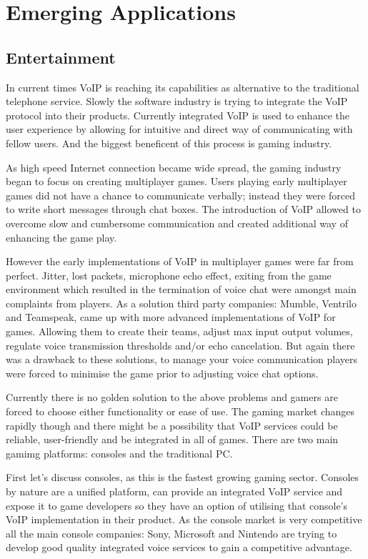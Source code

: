 
\section{Emerging  Applications}

\subsection{Entertainment}

In current times VoIP is reaching its capabilities as alternative to the traditional telephone service. Slowly the software industry is trying to integrate the VoIP protocol into their products. Currently integrated VoIP is used to enhance the user experience by allowing for intuitive and direct way of communicating with fellow users. And the biggest beneficent of this process is gaming industry. 

As high speed Internet connection became wide spread, the gaming industry began to focus on creating multiplayer games. Users playing early multiplayer games did not have a chance to communicate verbally; instead they were forced to write short messages through chat boxes. The introduction of VoIP allowed to overcome slow and cumbersome communication and created additional way of enhancing the game play\cite{website:voip_impact_on_gaming}.

However the early implementations of VoIP in multiplayer games were far from perfect. Jitter, lost packets, microphone echo effect, exiting from the game environment which resulted in the termination of voice chat were amongst main complaints from players. As a solution third party companies: Mumble, Ventrilo and Teamspeak, came up with more advanced implementations of VoIP for games. Allowing them to create their teams, adjust max input output volumes, regulate voice transmission thresholds and/or echo cancelation. But again there was a drawback to these solutions, to manage your voice communication players were forced to minimise the game prior to adjusting voice chat options.

Currently there is no golden solution to the above problems and gamers are forced to choose either functionality or ease of use. The gaming market changes rapidly though and there might be a possibility that VoIP services could be reliable, user-friendly and be integrated in all of games. There are two main gamimg platforms: consoles and the traditional PC.

First let's discuss consoles, as this is the fastest growing gaming sector\cite{website:shift_in_gaming_demographics}. Consoles by nature are a unified platform, can provide an integrated VoIP service and expose it to game developers so they have an option of utilising that console's VoIP implementation in their product. As the console market is very competitive all the main console companies: Sony, Microsoft and Nintendo are trying to develop good quality integrated voice services to gain a competitive advantage\cite{website:voip_adataion}.

